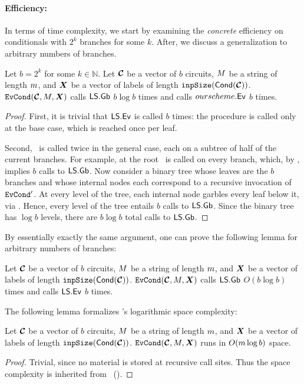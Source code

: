 \paragraph{Efficiency:} In terms of time complexity, we start by examining the \emph{concrete}
efficiency on conditionals with $2^k$ branches for some $k$.
%
After, we discuss a generalization to arbitrary numbers of branches.

\begin{lemma}\label{lemma:evcondtime}
  Let $b = 2^k$ for some $k \in \mathbb{N}$.
  Let $\vec{\cir}$ be a vector of $b$ circuits, $M$ be a string of
  length $m$, and $\gcirinp$ be a vector of labels of length
  $\inpsize(\conditional(\vec{\cir}))$.
  $\evcond(\vec{\cir}, \mat, \gcirinp)$ calls $\textsf{LS}.\textsf{Gb}$ $b \log b$ times
  and calls $ourscheme.\textsf{Ev}$ $b$ times.
\end{lemma}
\begin{proof}
  First, it is trivial that $\textsf{LS}.\textsf{Ev}$ is called $b$ times: the
  procedure is called only at the base case, which is reached once per
  leaf.

  Second, \gbtree\ is called twice in the general case, each on a
  subtree of half of the current branches.
  For example, at the root \gbtree\ is called on every branch, which, by
  , implies $b$ calls to $\textsf{LS}.\mathsf{Gb}$.
  Now consider a binary tree whose leaves are the $b$
  branches and whose internal nodes each correspond to
  a recursive invocation of $\mathtt{EvCond}'$.
  At every level of the tree, each internal node garbles every
  leaf below it, via \gbtree.
  Hence, every level of the tree entails $b$ calls to $\textsf{LS}.\mathsf{Gb}$.
  Since the binary tree has $\log b$ levels, there are $b
  \log b$ total calls to $\textsf{LS}.\mathsf{Gb}$.
\end{proof}

By essentially exactly the same argument, one can prove the following
lemma for arbitrary numbers of branches:
\begin{lemma}\label{lemma:evcondtime-general}
  Let $\vec{\cir}$ be a vector of $b$ circuits, $M$ be a string of
  length $m$, and $\gcirinp$ be a vector of labels of length
  $\inpsize(\conditional(\vec{\cir}))$.
  $\evcond(\vec{\cir}, \mat, \gcirinp)$ calls $\textsf{LS}.\textsf{Gb}$ $O(b \log b)$ times
  and calls $\textsf{LS}.\textsf{Ev}$ $b$ times.
\end{lemma}

The following lemma formalizes \evcond's logarithmic space complexity:
\begin{lemma}\label{lemma:evcondspace}
  Let $\vec{\cir}$ be a vector of $b$ circuits, $M$ be a string of
  length $m$, and $\gcirinp$ be a vector of labels of length
  $\inpsize(\conditional(\vec{\cir}))$.
  $\evcond(\vec{\cir}, \mat, \gcirinp)$ runs in $O(m \log b)$ space.
\end{lemma}
\begin{proof}
  Trivial, since no material is stored at recursive call sites.
  Thus the space complexity is inherited from
  \gbtree~().
\end{proof}

